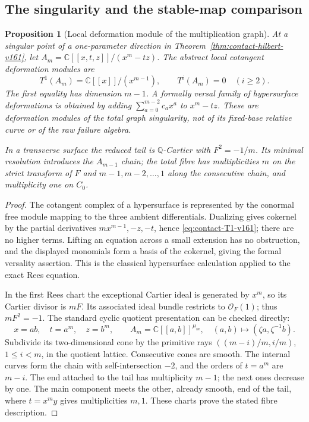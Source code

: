 \documentclass[11pt,reqno]{amsart}
\numberwithin{equation}{section}
\newtheorem{proposition}[theorem]{Proposition}
\theoremstyle{definition}\newtheorem{definition}[theorem]{Definition}
\theoremstyle{remark}\newtheorem{remark}[theorem]{Remark}
\newcommand{\C}{\mathbb C}\newcommand{\Q}{\mathbb Q}
\newcommand{\OO}{\mathcal O}\newcommand{\II}{\mathcal I}
\begin{document}
\subsection{The singularity and the stable-map comparison}
\begin{proposition}[Local deformation module of the multiplication graph]
\label{prop:contact-deformations-v161}
At a singular point of a one-parameter direction in
Theorem~\ref{thm:contact-hilbert-v161}, let
$A_m=\C[[x,t,z]]/(x^m-tz)$. The abstract local cotangent deformation
modules are
\begin{equation}\label{eq:contact-T1-v161}
 T^1(A_m)=\C[[x]]/(x^{m-1}),\qquad T^i(A_m)=0\quad(i\geq2).
\end{equation}
The first equality has dimension $m-1$. A formally versal family of
hypersurface deformations is obtained by adding
$\sum_{a=0}^{m-2}c_a x^a$ to $x^m-tz$. These are deformation modules
of the total graph singularity, not of its fixed-base relative curve
or of the raw failure algebra.

In a transverse surface the reduced tail is $\Q$-Cartier with
$F^2=-1/m$. Its minimal resolution introduces the $A_{m-1}$ chain;
the total fibre has multiplicities $m$ on the strict transform of
$F$ and $m-1,m-2,\ldots,1$ along the consecutive chain, and
multiplicity one on $C_0$.
\end{proposition}
\begin{proof}
The cotangent complex of a hypersurface is represented by the
conormal free module mapping to the three ambient differentials.
Dualizing gives cokernel by the partial derivatives
$mx^{m-1},-z,-t$, hence \eqref{eq:contact-T1-v161}; there are no higher
terms. Lifting an equation across a small extension has no obstruction,
and the displayed monomials form a basis of the cokernel, giving the
formal versality assertion. This is the classical hypersurface
calculation applied to the exact Rees equation.

In the first Rees chart the exceptional Cartier ideal is generated
by $x^m$, so its Cartier divisor is $mF$. Its associated ideal bundle
restricts to $\OO_F(1)$; thus $mF^2=-1$. The standard cyclic quotient
presentation can be checked directly:
\[
 x=ab,\quad t=a^m,\quad z=b^m,
 \qquad A_m=\C[[a,b]]^{\mu_m},\quad
 (a,b)\mapsto(\zeta a,\zeta^{-1}b).
\]
Subdivide its two-dimensional cone by the primitive rays
$((m-i)/m,i/m)$, $1\leq i<m$, in the quotient lattice. Consecutive
cones are smooth. The internal curves form the chain with
self-intersection $-2$, and the orders of $t=a^m$ are $m-i$.
The end attached to the tail has multiplicity $m-1$; the next ones
decrease by one. The main component meets the other, already smooth,
end of the tail, where $t=x^m y$ gives multiplicities $m,1$.
These charts prove the stated fibre description.
\end{proof}
\end{document}
